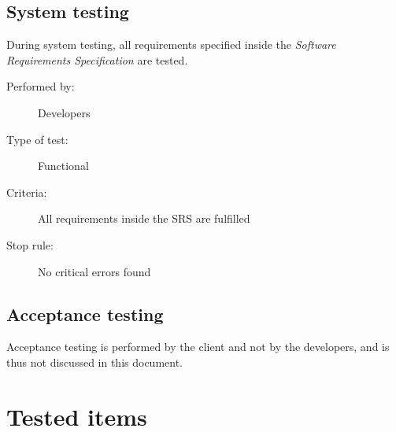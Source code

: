 \documentclass[12pt,titlepage]{article}
\begin{document}
%
%
%
%

\subsection{System testing}
\label{subsec:test-process-system-testing}

During system testing, all requirements specified inside the \textit{Software
Requirements Specification} are tested.

\begin{description}
	\item[Performed by:]	Developers
	\item[Type of test:]	Functional
	\item[Criteria:]	All requirements inside the SRS are fulfilled
	\item[Stop rule:]	No critical errors found
\end{description}

\subsection{Acceptance testing}
\label{subsec:test-process-acceptance-testing}

Acceptance testing is performed by the client and not by the developers, and is
thus not discussed in this document.


\section{Tested items}
\label{sec:tested-items}
\end{document}
